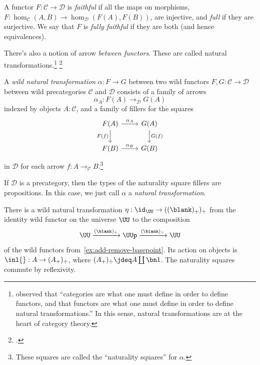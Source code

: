 \begin{definition}\label{def:full-faithful}
  A functor $F : \mathcal C \to \mathcal D$ is \emph{faithful}
  if all the maps on morphisms, $F : \hom_{\mathcal C}(A, B) \to
  \hom_{\mathcal D}(F(A), F(B))$, are injective,
  and \emph{full} if they are surjective. We say that $F$ is
  \emph{fully faithful} if they are both (and hence equivalences).
\end{definition}

There's also a notion of arrow \emph{between functors}.
These are called natural transformations.\footnote{%
  \citeauthor{Freyd1964}\footnotemark{} observed that ``categories are what one must define
  in order to define functors, and that functors are what one must define
  in order to define natural transformations.''
  In this sense, natural transformations are at the heart of category theory.}%
\footcitetext{Freyd1964}
\begin{definition}\label{def:nat-trans}
  A \emph{wild natural transformation}
  $\alpha : F \to G$ between
  two wild functors $F,G : \mathcal C \to \mathcal D$ between
  wild precategories $\mathcal C$ and $\mathcal D$
  consists of a family of arrows
  \[
    \alpha_A : F(A) \to_{\mathcal D} G(A)
  \]
  indexed by objects $A:\mathcal C$,
  and a family of fillers for the squares
  \[
    \begin{tikzcd}
      F(A) \ar[r,"\alpha_A"]\ar[d,"F(f)"'] & G(A) \ar[d,"G(f)"] \\
      F(B) \ar[r,"\alpha_B"] & G(B)
    \end{tikzcd}
  \]
  in $\mathcal D$
  for each arrow $f : A \to_{\mathcal C} B$.\footnote{%
    These squares are called the ``naturality squares'' for $\alpha$.}

  If $\mathcal D$ is a precategory, then the types of the naturality square fillers
  are propositions. In this case, we just call $\alpha$ a \emph{natural transformation}.
\end{definition}
\begin{example}\label{ex:pt-unpt-unit}
  There is a wild
  natural transformation $\eta : \id_{\UU} \to ((\blank)_+)_\div$
  from the identity wild functor on the universe $\UU$
  to the composition
  \[
    \UU \xrightarrow{(\blank)_+} \UUp \xrightarrow{(\blank)_\div} \UU
  \]
  of the wild functors from~\cref{ex:add-remove-basepoint}.
  Its action on objects is $\inl{} : A \to (A_+)_\div$,
  where $(A_+)_\div \jdeq A \coprod\bn 1$.
  The naturality squares commute by reflexivity.
\end{example}
